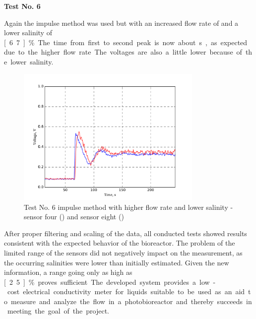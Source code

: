 \textbf{Test No. 6}

Again the impulse method was used but with an increased flow rate of  and a lower salinity of \unit[6.7]{\%}. The time from first to second peak is now about \unit[40]{s}, as expected due to the higher flow rate. The voltages are also a little lower because of the lower salinity.

\begin{figure}[H]
	\begin{center}
		\includegraphics[width=0.8\textwidth]{images/log080716_6.pdf} 
		\caption{Test No. 6 impulse method with higher flow rate and lower salinity - sensor four (\drawline[blue]) and sensor eight (\drawline[red])}
		\label{fig:test6}
	\end{center}
\end{figure}

After proper filtering and scaling of the data, all conducted tests showed results consistent with the expected behavior of the bioreactor. The problem of the limited range of the sensors did not negatively impact on the measurement, as the occurring salinities were lower than initially estimated. Given the new information, a range going only as high as \unit[2.5]{\%} proves sufficient. The developed system provides a low-cost electrical conductivity meter for liquids suitable to be used as an aid to measure and analyze the flow in a photobioreactor and thereby succeeds in meeting the goal of the project.